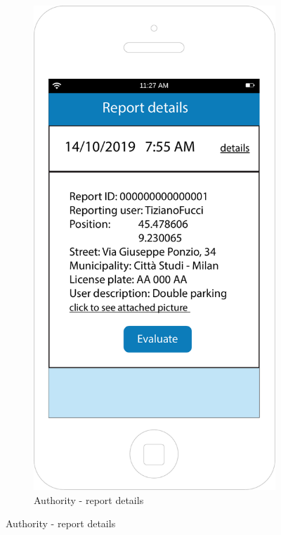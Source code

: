 \documentclass[12pt,a4paper]{report}
\begin{document}
\begin{figure}[H]
\begin{subfigure}{0.5\textwidth}
			\label{Authority - suggestion}
		\end{subfigure}
		\begin{subfigure}{0.5\textwidth}
			\includegraphics[scale=0.25, center]{Reportdetails}
			\caption{Authority - report details}
			\label{Authority - report details}
		\end{subfigure}
		\end{figure}
		
\end{document}
